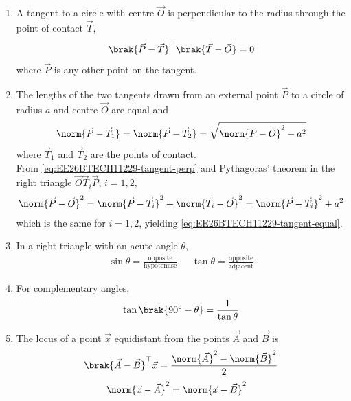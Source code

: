 \begin{enumerate}[label=\thesubsection.\arabic*, ref=\thesubsection.\theenumi]
\item A tangent to a circle with centre $\vec{O}$ is perpendicular to the radius through the point of contact $\vec{T}$,
\begin{align}
	\brak{\vec{P}-\vec{T}}^{\top}\brak{\vec{T}-\vec{O}} = 0
	\label{eq:EE26BTECH11229-tangent-perp}
\end{align}
where $\vec{P}$ is any other point on the tangent.
\item The lengths of the two tangents drawn from an external point $\vec{P}$ to a circle of radius $a$ and centre $\vec{O}$ are equal and
\begin{align}
	\norm{\vec{P}-\vec{T}_1} = \norm{\vec{P}-\vec{T}_2} = \sqrt{\norm{\vec{P}-\vec{O}}^2 - a^2}
	\label{eq:EE26BTECH11229-tangent-equal}
\end{align}
where $\vec{T}_1$ and $\vec{T}_2$ are the points of contact.
\\
\solution
From \eqref{eq:EE26BTECH11229-tangent-perp} and Pythagoras' theorem in the right triangle $\vec{O}\vec{T}_i\vec{P}$, $i=1,2$,
\begin{align}
	\norm{\vec{P}-\vec{O}}^2 = \norm{\vec{P}-\vec{T}_i}^2 + \norm{\vec{T}_i-\vec{O}}^2
	= \norm{\vec{P}-\vec{T}_i}^2 + a^2
\end{align}
which is the same for $i=1,2$, yielding \eqref{eq:EE26BTECH11229-tangent-equal}.
\item In a right triangle with an acute angle $\theta$,
\begin{align}
	\sin\theta = \frac{\text{opposite}}{\text{hypotenuse}}, \quad
	\tan\theta = \frac{\text{opposite}}{\text{adjacent}}
	\label{eq:EE26BTECH11229-trig}
\end{align}
\item For complementary angles,
\begin{align}
	\tan\brak{90^{\circ}-\theta} = \frac{1}{\tan\theta}
	\label{eq:EE26BTECH11229-tan-comp}
\end{align}
\item The locus of a point $\vec{x}$ equidistant from the points $\vec{A}$ and $\vec{B}$ is
\begin{align}
	\brak{\vec{A}-\vec{B}}^{\top}\vec{x} = \frac{\norm{\vec{A}}^2 - \norm{\vec{B}}^2}{2}
	\label{eq:EE26BTECH11229-perp-bisector}
\end{align}
\solution
\begin{align}
	\norm{\vec{x}-\vec{A}}^2 &= \norm{\vec{x}-\vec{B}}^2

\end{align}
\end{enumerate}

